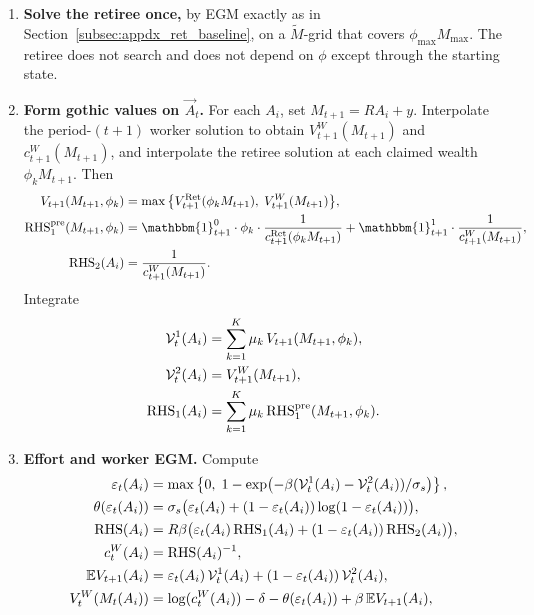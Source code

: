 \begin{enumerate}
	\item \textbf{Solve the retiree once,} by EGM exactly as in Section~\ref{subsec:appdx_ret_baseline}, on a $\tilde M$-grid that covers $\phi_{\max}M_{\max}$. The retiree does not search and does not depend on $\phi$ except through the starting state.
	\item \textbf{Form gothic values on $\vec A_t$.} For each $A_i$, set $M_{t+1}=R A_i+y$. Interpolate the period-$(t+1)$ worker solution to obtain $V_{t+1}^{W}(M_{t+1})$ and $c_{t+1}^{W}(M_{t+1})$, and interpolate the retiree solution at each claimed wealth $\phi_k M_{t+1}$. Then
	\begin{align}
		V_{t+1}(M_{t+1},\phi_k)
		&= \max\big\{
			V_{t+1}^{\Ret}(\phi_k M_{t+1}),\;
			V_{t+1}^{W}(M_{t+1})
		\big\},
		\\
		\mathrm{RHS}_1^{\mathrm{pre}}(M_{t+1},\phi_k)
		&= \mathbbm{1}_{t+1}^{0}\cdot\phi_k\cdot\frac{1}{c_{t+1}^{\Ret}(\phi_k M_{t+1})}
		+\mathbbm{1}_{t+1}^{1}\cdot\frac{1}{c_{t+1}^{W}(M_{t+1})},
		\\
		\mathrm{RHS}_2(A_i)
		&= \frac{1}{c_{t+1}^{W}(M_{t+1})}.
	\end{align}
	Integrate
	\begin{align}
		\mathcal{V}_t^{1}(A_i)
		&= \sum_{k=1}^{K}\mu_k\,V_{t+1}(M_{t+1},\phi_k),
		\\
		\mathcal{V}_t^{2}(A_i)
		&= V_{t+1}^{W}(M_{t+1}),
		\\
		\mathrm{RHS}_1(A_i)
		&= \sum_{k=1}^{K}\mu_k\,\mathrm{RHS}_1^{\mathrm{pre}}(M_{t+1},\phi_k).
	\end{align}
	\item \textbf{Effort and worker EGM.} Compute
	\begin{align}
		\eff_t(A_i)
		&= \max\left\{0,\;
			1-\exp\bigl(-\beta(\goth{V}_t^{1}(A_i)-\goth{V}_t^{2}(A_i))/\sigma_s\bigr)
		\right\},
		\\
		\theta(\eff_t(A_i))
		&= \sigma_s\bigl(\eff_t(A_i)+(1-\eff_t(A_i))\log(1-\eff_t(A_i))\bigr),
		\\
		\mathrm{RHS}(A_i)
		&= R\beta\bigl(
			\eff_t(A_i)\,\mathrm{RHS}_1(A_i)
			+(1-\eff_t(A_i))\,\mathrm{RHS}_2(A_i)
		\bigr),
		\\
		c_t^{W}(A_i)
		&= \mathrm{RHS}(A_i)^{-1},
		\\
		\mathbb{E}V_{t+1}(A_i)
		&= \eff_t(A_i)\,\goth{V}_t^{1}(A_i)
		+(1-\eff_t(A_i))\,\goth{V}_t^{2}(A_i),
		\\
		V_t^{W}(M_t(A_i))
		&= \log(c_t^{W}(A_i))-\delta-\theta(\eff_t(A_i))
		+\beta\,\mathbb{E}V_{t+1}(A_i),

\end{align}
\end{enumerate}
